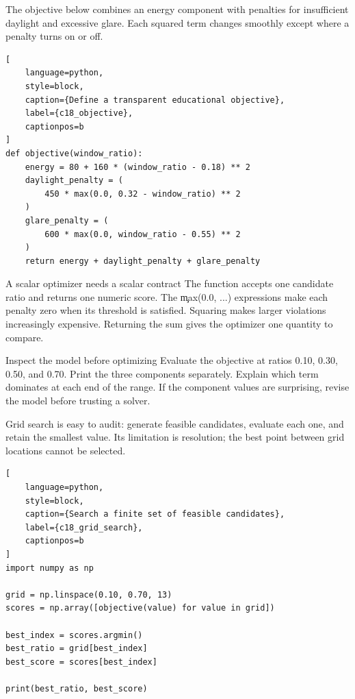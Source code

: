 The objective below combines an energy component with penalties for insufficient
daylight and excessive glare. Each squared term changes smoothly except where a
penalty turns on or off.

\begin{lstlisting}[
    language=python,
    style=block,
    caption={Define a transparent educational objective},
    label={c18_objective},
    captionpos=b
]
def objective(window_ratio):
    energy = 80 + 160 * (window_ratio - 0.18) ** 2
    daylight_penalty = (
        450 * max(0.0, 0.32 - window_ratio) ** 2
    )
    glare_penalty = (
        600 * max(0.0, window_ratio - 0.55) ** 2
    )
    return energy + daylight_penalty + glare_penalty
\end{lstlisting}

\begin{SyntaxBox}{A scalar optimizer needs a scalar contract}
The function accepts one candidate ratio and returns one numeric score. The
\c{max(0.0, ...)} expressions make each penalty zero when its threshold is
satisfied. Squaring makes larger violations increasingly expensive. Returning
the sum gives the optimizer one quantity to compare.
\end{SyntaxBox}

\begin{TryBox}{Inspect the model before optimizing}
Evaluate the objective at ratios 0.10, 0.30, 0.50, and 0.70. Print the three
components separately. Explain which term dominates at each end of the range.
If the component values are surprising, revise the model before trusting a
solver.
\end{TryBox}


Grid search is easy to audit: generate feasible candidates, evaluate each one,
and retain the smallest value. Its limitation is resolution; the best point
between grid locations cannot be selected.

\begin{lstlisting}[
    language=python,
    style=block,
    caption={Search a finite set of feasible candidates},
    label={c18_grid_search},
    captionpos=b
]
import numpy as np

grid = np.linspace(0.10, 0.70, 13)
scores = np.array([objective(value) for value in grid])

best_index = scores.argmin()
best_ratio = grid[best_index]
best_score = scores[best_index]

print(best_ratio, best_score)
\end{lstlisting}

